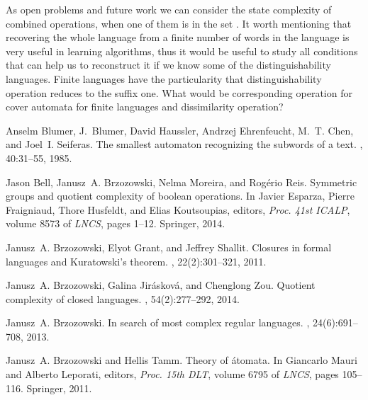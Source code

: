 \documentclass{article}
\begin{document}
As open problems and future work we can consider the state complexity of combined
operations, when one of them is in the set .
It worth mentioning that recovering the whole language from a finite number of words in the language
 is very useful in learning algorithms, thus  it would be useful to study all 
conditions that can help us to reconstruct it if we know some of the distinguishability languages.
Finite languages have the particularity that distinguishability operation reduces to the suffix one.
What would be corresponding operation for cover automata for finite languages and dissimilarity operation? 


\newcommand{\etalchar}[1]{}
\begin{thebibliography}{BBMR14}

\bibitem[BBH{\etalchar{+}}85]{blumer85:_small_autom_recog_subwor_of_text}
Anselm Blumer, J.~Blumer, David Haussler, Andrzej Ehrenfeucht, M.~T. Chen, and
  Joel~I. Seiferas.
\newblock The smallest automaton recognizing the subwords of a text.
, 40:31--55, 1985.

Jason Bell, Janusz~A. Brzozowski, Nelma Moreira, and Rog{\'e}rio Reis.
\newblock Symmetric groups and quotient complexity of boolean operations.
\newblock In Javier Esparza, Pierre Fraigniaud, Thore Husfeldt, and Elias
  Koutsoupias, editors, {\em Proc. 41st ICALP}, volume 8573 of {\em LNCS},
  pages 1--12. Springer, 2014.

Janusz~A. Brzozowski, Elyot Grant, and Jeffrey Shallit.
\newblock Closures in formal languages and {Kuratowski}'s theorem.
, 22(2):301--321, 2011.

Janusz~A. Brzozowski, Galina Jir{\'a}skov{\'a}, and Chenglong Zou.
\newblock Quotient complexity of closed languages.
, 54(2):277--292, 2014.

Janusz~A. Brzozowski.
\newblock In search of most complex regular languages.
, 24(6):691--708, 2013.

Janusz~A. Brzozowski and Hellis Tamm.
\newblock Theory of {\'a}tomata.
\newblock In Giancarlo Mauri and Alberto Leporati, editors, {\em Proc. 15th
  DLT}, volume 6795 of {\em LNCS}, pages 105--116. Springer, 2011.


\end{thebibliography}
\end{document}
